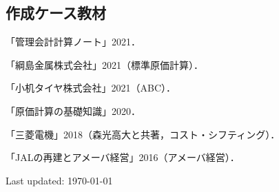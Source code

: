 \documentclass[letterpaper,uplatex]{article}
\def\footerlink{http://jblevins.org/projects/cv-template/}
\renewenvironment{itemize}{
  \begin{list}{}{
    \setlength{\leftmargin}{1.5em}
  }
}{
  \end{list}
}
\begin{document}
\subsection*{作成ケース教材}

\begin{itemize}
    \item 「管理会計計算ノート」2021．
    \item 「綱島金属株式会社」2021（標準原価計算）．
    \item 「小机タイヤ株式会社」2021（ABC）．
   \item 「原価計算の基礎知識」2020． 
   \item 「三菱電機」2018（森光高大と共著，コスト・シフティング）．
   \item 「JALの再建とアメーバ経営」2016（アメーバ経営）．
\end{itemize}

\bigskip

\begin{center}
  \begin{footnotesize}
    Last updated: \today \\
  \end{footnotesize}
\end{center}
\end{document}
